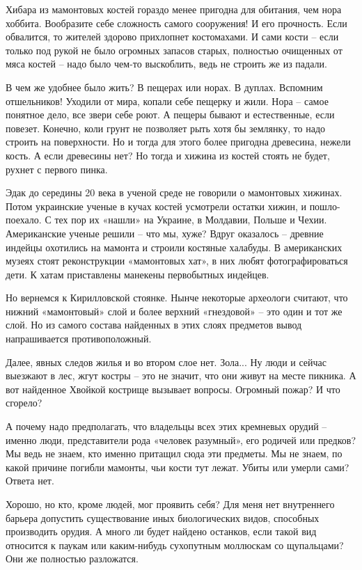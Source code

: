 Хибара из мамонтовых костей гораздо менее пригодна для обитания, чем нора хоббита. Вообразите себе сложность самого сооружения! И его прочность. Если обвалится, то жителей здорово прихлопнет костомахами. И сами кости – если только под рукой не было огромных запасов старых, полностью очищенных от мяса костей – надо было чем-то выскоблить, ведь не строить же из падали.

В чем же удобнее было жить? В пещерах или норах. В дуплах. Вспомним отшельников! Уходили от мира, копали себе пещерку и жили. Нора – самое понятное дело, все звери себе роют. А пещеры бывают и естественные, если повезет. Конечно, коли грунт не позволяет рыть хотя бы землянку, то надо строить на поверхности. Но и тогда для этого более пригодна древесина, нежели кость. А если древесины нет? Но тогда и хижина из костей стоять не будет, рухнет с первого пинка.

Эдак до середины 20 века в ученой среде не говорили о мамонтовых хижинах. Потом украинские ученые в кучах костей усмотрели остатки хижин, и пошло-поехало. С тех пор их «нашли» на Украине, в Молдавии, Польше и Чехии. Американские ученые решили – что мы, хуже? Вдруг оказалось – древние индейцы охотились на мамонта и строили костяные халабуды. В американских музеях стоят реконструкции «мамонтовых хат», в них любят фотографироваться дети. К хатам приставлены манекены первобытных индейцев.

Но вернемся к Кирилловской стоянке. Нынче некоторые археологи считают, что нижний «мамонтовый» слой и более верхний «гнездовой» – это один и тот же слой. Но из самого состава найденных в этих слоях предметов вывод напрашивается противоположный.

Далее, явных следов жилья и во втором слое нет. Зола... Ну люди и сейчас выезжают в лес, жгут костры – это не значит, что они живут на месте пикника. А вот найденное Хвойкой кострище вызывает вопросы. Огромный пожар? И что сгорело?

А почему надо предполагать, что владельцы всех этих кремневых орудий – именно люди, представители рода «человек разумный», его родичей или предков? Мы ведь не знаем, кто именно притащил сюда эти предметы. Мы не знаем, по какой причине погибли мамонты, чьи кости тут лежат. Убиты или умерли сами? Ответа нет.

Хорошо, но кто, кроме людей, мог проявить себя? Для меня нет внутреннего барьера допустить существование иных биологических видов, способных производить орудия. А много ли будет найдено останков, если такой вид относится к паукам или каким-нибудь сухопутным моллюскам со щупальцами? Они же полностью разложатся.

